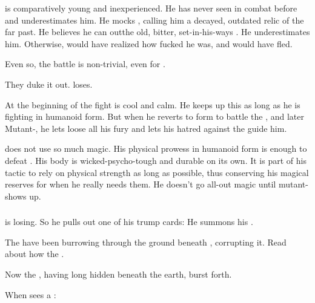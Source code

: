 \Teshrial{} is comparatively young and inexperienced. 
He has never seen \Ishnaruchaefir{} in combat before and underestimates him. 
He mocks \Ishnaruchaefir, calling him a decayed, outdated relic of the far past. 
He believes he can out\manoeuvre the old, bitter, set-in-his-ways \shaeeroth.
He underestimates him. 
Otherwise, \Teshrial{} would have realized how fucked he was, and would have fled. 

Even so, the battle is non-trivial, even for \Ishnaruchaefir. 

They duke it out. 
\Teshrial{} loses. 

At the beginning of the fight \Ishnaruchaefir{} is cool and calm. 
He keeps up this \facade{} as long as he is fighting in humanoid form. 
But when he reverts to \draconian{} form to battle the \noggyaleth{}, and later Mutant-\Teshrial, he lets loose all his \draconian{} fury and lets his hatred against the \resphain{} guide him. 

\Ishnaruchaefir{} does not use so much magic. 
His physical prowess in humanoid form is enough to defeat \Teshrial{}. 
His body is wicked-psycho-tough and durable on its own. 
It is part of his tactic to rely on physical strength as long as possible, thus conserving his magical reserves for when he really needs them. 
He doesn't go all-out magic until mutant-\Teshrial{} shows up. 





\subsubsection{\Noggyaleth}
\Teshrial{} is losing. 
So he pulls out one of his trump cards: 
He summons his \noggyaleth. 

The \noggyaleth have been burrowing through the ground beneath \Malcur, corrupting it.
Read about how the \noggyaleth {}. 

Now the \noggyaleth, having long hidden beneath the earth, burst forth.

When \Criseis sees a \noggyal:

